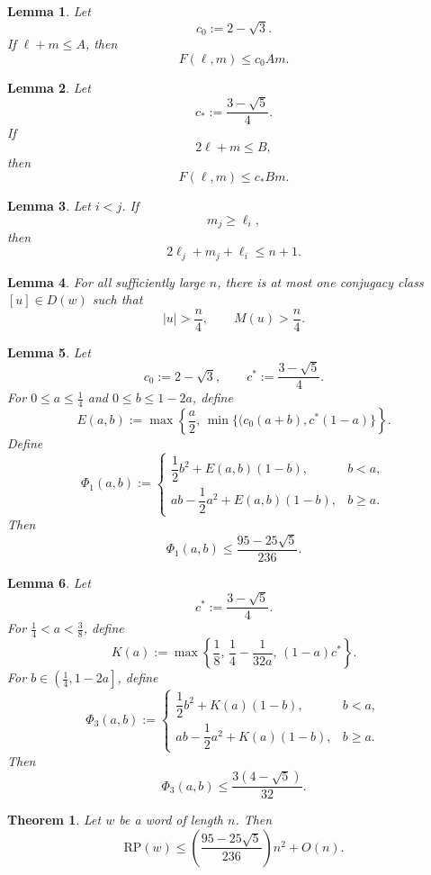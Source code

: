 \documentclass[10pt,a4paper]{amsart}
\newtheorem{lem}{Lemma}
\newtheorem{thm}{Theorem}
\newcommand{\rp}{\mathrm{RP}}
\begin{document}
\begin{lem}\label{lem:A-optimization}
Let
\[
        c_0:=2-\sqrt3.
\]
If \(\ell+m\le A\), then
\[
        F(\ell,m)\le c_0Am.
\]
\end{lem}

\begin{lem}\label{lem:B-optimization}
Let
\[
        c_*:=\frac{3-\sqrt5}{4}.
\]
If
\[
        2\ell+m\le B,
\]
then
\[
        F(\ell,m)\le c_*Bm.
\]
\end{lem}

\begin{lem}\label{lem:pairwise-A}
Let \(i<j\). If
\[
        m_j\ge \ell_i,
\]
then
\[
        2\ell_j+m_j+\ell_i\le n+1.
\]
\end{lem}

\begin{lem}\label{lem:large-large-unique}
For all sufficiently large \(n\), there is at most one conjugacy class
\([u]\in D(w)\) such that
\[
        |u|>\frac n4,
        \qquad
        M(u)>\frac n4 .
\]
\end{lem}

\begin{lem}\label{lem:optimization-case1}
Let
\[
c_0:=2-\sqrt{3},\qquad c^*:=\frac{3-\sqrt{5}}{4}.
\]
For \(0\leq a\leq \frac14\) and \(0\leq b\leq 1-2a\), define
\[
E(a,b):=
\max\left\{
\frac a2,\,
\min\{(c_0(a+b),c^*(1-a)\}
\right\}.
\]
Define
\[
\Phi_1(a,b):=
\begin{cases}
\dfrac12 b^2+E(a,b)(1-b), & b<a,\\[6pt]
ab-\dfrac12a^2+E(a,b)(1-b), & b\geq a.
\end{cases}
\]
Then
\[
\Phi_1(a,b)\leq \frac{95-25\sqrt5}{236}.
\]
\end{lem}

\begin{lem}\label{lem:optimization-case3}
Let
\[
c^*:=\frac{3-\sqrt5}{4}.
\]
For \(\frac14<a<\frac38\), define
\[
K(a):=
\max\left\{
\frac18,\,
\frac14-\frac1{32a},\,
(1-a)c^*
\right\}.
\]
For \(b\in\left(\frac14,1-2a\right]\), define
\[
\Phi_3(a,b):=
\begin{cases}
\dfrac12 b^2+K(a)(1-b), & b<a,\\[6pt]
ab-\dfrac12a^2+K(a)(1-b), & b\geq a.
\end{cases}
\]
Then
\[
\Phi_3(a,b)\leq \frac{3(4-\sqrt5)}{32}.
\]
\end{lem}

\begin{thm}\label{thm:rp-upper-bound}
Let \(w\) be a word of length \(n\). Then
\[
        \rp(w)\le
        \left(\frac{95-25\sqrt5}{236}\right)n^2+O(n).
\]
\end{thm}
\end{document}
